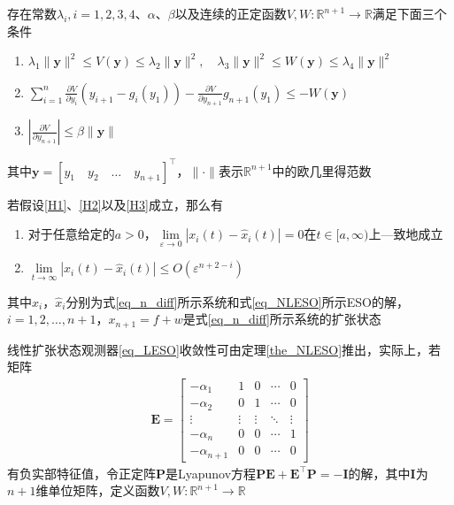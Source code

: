 \begin{assumption}
存在常数$ \lambda_i,i=1,2,3,4 $、$ \alpha $、$ \beta $以及连续的正定函数$ V,W:\mathbb{R}^{n+1} \rightarrow \mathbb{R} $满足下面三个条件
\begin{enumerate}
	\item $ \lambda_{1}\|\bm{y}\|^{2} \leq V(\bm{y}) \leq \lambda_{2}\|\bm{y}\|^{2}, \quad \lambda_{3}\|\bm{y}\|^{2} \leq W(\bm{y}) \leq \lambda_{4}\|\bm{y}\|^{2} $ 
	\item $ \sum_{i=1}^{n} \frac{\partial V}{\partial y_{i}}\left(y_{i+1}-g_{i}\left(y_{1}\right)\right)-\frac{\partial V}{\partial y_{n+1}} g_{n+1}\left(y_{1}\right) \leq-W(\bm{y}) $ 
	\item $ \left|\frac{\partial V}{\partial y_{n+1}}\right| \leq \beta\|\bm{y}\| $		
\end{enumerate}
其中$\bm{y}=[y_{1} \quad y_{2} \quad \ldots \quad y_{n+1}]^{\top}$，$\|\cdot\|$表示$ \mathbb{R}^{n+1} $中的欧几里得范数	\label{H3}
\end{assumption}
\begin{theorem}
若假设\ref{H1}、\ref{H2}以及\ref{H3}成立，那么有
	\begin{enumerate}
		\item 对于任意给定的$ a>0 $，$ \lim\limits_{\varepsilon \rightarrow 0}\left|x_{i}(t)-\hat{x}_{i}(t)\right|=0 $在$t \in [a, \infty)$上—致地成立	
		\item $ \lim\limits_{t \rightarrow \infty}\left|x_{i}(t)-\hat{x}_{i}(t)\right| \leq O\left(\varepsilon^{n+2-i}\right)  $
	\end{enumerate}
其中$x_{i}$，$ \hat{x}_{i}$分别为式\eqref{eq_n_diff}所示系统和式\eqref{eq_NLESO}所示ESO的解，$i=1,2, \ldots, n+1$，$ x_{n+1}=f+w$是式\eqref{eq_n_diff}所示系统的扩张状态	\label{the_NLESO}
\end{theorem}
线性扩张状态观测器\eqref{eq_LESO}收敛性可由定理\ref{the_NLESO}推出，实际上，若矩阵
\begin{align}
\bm{E}=\begin{bmatrix}
-\alpha_{1} & 1 & 0 & \cdots & 0 \\
-\alpha_{2} & 0 & 1 & \cdots & 0 \\
\vdots & \vdots & \vdots & \ddots & \vdots \\
-\alpha_{n} & 0 & 0 & \cdots & 1 \\
-\alpha_{n+1} & 0 & 0 & \cdots & 0
\end{bmatrix}	\label{eq_Hur}
\end{align}
有负实部特征值，令正定阵$ \bm{P} $是Lyapunov方程$\bm{P} \bm{E}+\bm{E}^{\top} \bm{P}=-\bm{I}$的解，其中$ \bm{I} $为$ n+1 $维单位矩阵，定义函数$V, W: \mathbb{R}^{n+1} \rightarrow \mathbb{R}$
